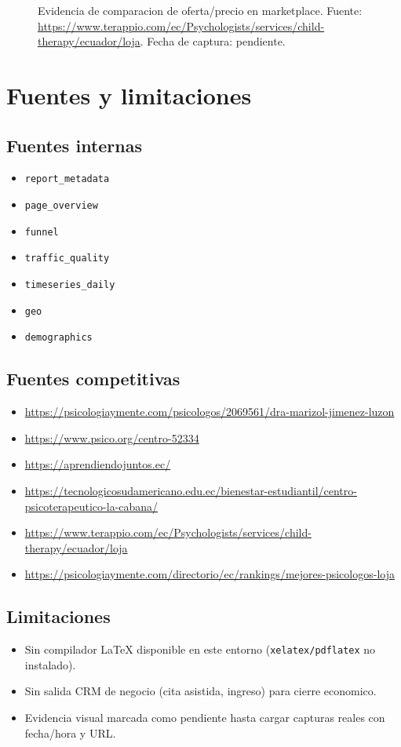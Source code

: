 \documentclass[9pt,a4paper,twocolumn,twoside]{tau-class/tau}
\begin{document}
\begin{figure}[H]
  \centering
  \caption{Evidencia de comparacion de oferta/precio en marketplace. Fuente: \url{https://www.terappio.com/ec/Psychologists/services/child-therapy/ecuador/loja}. Fecha de captura: pendiente.}
  \label{fig:market-terappio}
\end{figure}

\section{Fuentes y limitaciones}
\subsection{Fuentes internas}
\begin{itemize}
  \item \texttt{report\_metadata}
  \item \texttt{page\_overview}
  \item \texttt{funnel}
  \item \texttt{traffic\_quality}
  \item \texttt{timeseries\_daily}
  \item \texttt{geo}
  \item \texttt{demographics}
\end{itemize}

\subsection{Fuentes competitivas}
\begin{itemize}
  \item \url{https://psicologiaymente.com/psicologos/2069561/dra-marizol-jimenez-luzon}
  \item \url{https://www.psico.org/centro-52334}
  \item \url{https://aprendiendojuntos.ec/}
  \item \url{https://tecnologicosudamericano.edu.ec/bienestar-estudiantil/centro-psicoterapeutico-la-cabana/}
  \item \url{https://www.terappio.com/ec/Psychologists/services/child-therapy/ecuador/loja}
  \item \url{https://psicologiaymente.com/directorio/ec/rankings/mejores-psicologos-loja}
\end{itemize}

\subsection{Limitaciones}
\begin{itemize}
  \item Sin compilador LaTeX disponible en este entorno (\texttt{xelatex/pdflatex} no instalado).
  \item Sin salida CRM de negocio (cita asistida, ingreso) para cierre economico.
  \item Evidencia visual marcada como pendiente hasta cargar capturas reales con fecha/hora y URL.
\end{itemize}
\end{document}
